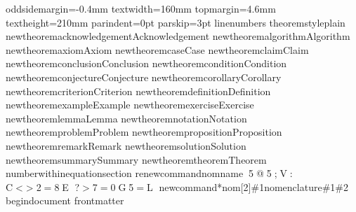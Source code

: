  %
 \ o d d s i d e m a r g i n = - 0 . 4 m m   \ t e x t w i d t h = 1 6 0 m m   \ t o p m a r g i n = 4 . 6 m m   \ t e x t h e i g h t = 2 1 0 m m   \ p a r i n d e n t = 0 p t   \ p a r s k i p = 3 p t 
 %
 %
 \ l i n e n u m b e r s 
 %
 \ t h e o r e m s t y l e { p l a i n } 
 \ n e w t h e o r e m { a c k n o w l e d g e m e n t } { A c k n o w l e d g e m e n t } 
 \ n e w t h e o r e m { a l g o r i t h m } { A l g o r i t h m } 
 \ n e w t h e o r e m { a x i o m } { A x i o m } 
 \ n e w t h e o r e m { c a s e } { C a s e } 
 \ n e w t h e o r e m { c l a i m } { C l a i m } 
 \ n e w t h e o r e m { c o n c l u s i o n } { C o n c l u s i o n } 
 \ n e w t h e o r e m { c o n d i t i o n } { C o n d i t i o n } 
 \ n e w t h e o r e m { c o n j e c t u r e } { C o n j e c t u r e } 
 \ n e w t h e o r e m { c o r o l l a r y } { C o r o l l a r y } 
 \ n e w t h e o r e m { c r i t e r i o n } { C r i t e r i o n } 
 \ n e w t h e o r e m { d e f i n i t i o n } { D e f i n i t i o n } 
 \ n e w t h e o r e m { e x a m p l e } { E x a m p l e } 
 \ n e w t h e o r e m { e x e r c i s e } { E x e r c i s e } 
 \ n e w t h e o r e m { l e m m a } { L e m m a } 
 \ n e w t h e o r e m { n o t a t i o n } { N o t a t i o n } 
 \ n e w t h e o r e m { p r o b l e m } { P r o b l e m } 
 \ n e w t h e o r e m { p r o p o s i t i o n } { P r o p o s i t i o n } 
 \ n e w t h e o r e m { r e m a r k } { R e m a r k } 
 \ n e w t h e o r e m { s o l u t i o n } { S o l u t i o n } 
 \ n e w t h e o r e m { s u m m a r y } { S u m m a r y } 
 \ n e w t h e o r e m { t h e o r e m } { T h e o r e m } 
 \ n u m b e r w i t h i n { e q u a t i o n } { s e c t i o n } 
 %
 %
 \ r e n e w c o m m a n d { \ n o m n a m e } { 5@5;V:  C<>2=8E  ?>7=0G5=L} 
 %
 \ n e w c o m m a n d * { \ n o m } [ 2 ] { # 1 \ n o m e n c l a t u r e { # 1 } { # 2 } } 
 %
 \ b e g i n { d o c u m e n t } 
 \ f r o n t m a t t e r 
